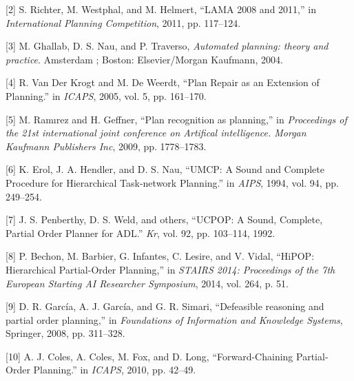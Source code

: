 \documentclass[]{article}
\begin{document}
\hypertarget{ref-richterux5flamaux5f2011}{}
{[}2{]} S. Richter, M. Westphal, and M. Helmert, ``LAMA 2008 and 2011,''
in \emph{International Planning Competition}, 2011, pp. 117--124.

\hypertarget{ref-ghallabux5fautomatedux5f2004}{}
{[}3{]} M. Ghallab, D. S. Nau, and P. Traverso, \emph{Automated
planning: theory and practice}. Amsterdam ; Boston: Elsevier/Morgan
Kaufmann, 2004.

\hypertarget{ref-vanux5fderux5fkrogtux5fplanux5f2005}{}
{[}4{]} R. Van Der Krogt and M. De Weerdt, ``Plan Repair as an Extension
of Planning.'' in \emph{ICAPS}, 2005, vol. 5, pp. 161--170.

\hypertarget{ref-ramirezux5fplanux5f2009}{}
{[}5{]} M. Ramırez and H. Geffner, ``Plan recognition as planning,'' in
\emph{Proceedings of the 21st international joint conference on
Artifical intelligence. Morgan Kaufmann Publishers Inc}, 2009, pp.
1778--1783.

\hypertarget{ref-erolux5fumcp:ux5f1994}{}
{[}6{]} K. Erol, J. A. Hendler, and D. S. Nau, ``UMCP: A Sound and
Complete Procedure for Hierarchical Task-network Planning.'' in
\emph{AIPS}, 1994, vol. 94, pp. 249--254.

\hypertarget{ref-penberthyux5fucpop:ux5f1992}{}
{[}7{]} J. S. Penberthy, D. S. Weld, and others, ``UCPOP: A Sound,
Complete, Partial Order Planner for ADL.'' \emph{Kr}, vol. 92, pp.
103--114, 1992.

\hypertarget{ref-bechonux5fhipop:ux5f2014}{}
{[}8{]} P. Bechon, M. Barbier, G. Infantes, C. Lesire, and V. Vidal,
``HiPOP: Hierarchical Partial-Order Planning,'' in \emph{STAIRS 2014:
Proceedings of the 7th European Starting AI Researcher Symposium}, 2014,
vol. 264, p. 51.

\hypertarget{ref-garciaux5fdefeasibleux5f2008}{}
{[}9{]} D. R. García, A. J. García, and G. R. Simari, ``Defeasible
reasoning and partial order planning,'' in \emph{Foundations of
Information and Knowledge Systems}, Springer, 2008, pp. 311--328.

\hypertarget{ref-colesux5fforward-chainingux5f2010}{}
{[}10{]} A. J. Coles, A. Coles, M. Fox, and D. Long, ``Forward-Chaining
Partial-Order Planning.'' in \emph{ICAPS}, 2010, pp. 42--49.
\end{document}
